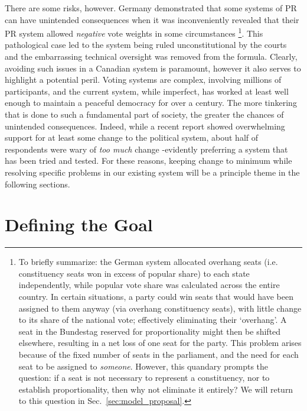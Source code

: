 \documentclass[DIV=calc, paper=a4, fontsize=11pt, twocolumn]{scrartcl}	 %
\begin{document}
There are some risks, however. Germany demonstrated that some systems of PR can have unintended consequences when it was inconveniently revealed that their PR system allowed \emph{negative} vote weights in some circumstances\cite{Die_Zeit_negative_vote} 
\footnote
{
To briefly summarize: the German system allocated overhang seats (i.e. constituency seats won in excess of popular share) to each state independently, while popular vote share was calculated across the entire country.
In certain situations, a party could win seats that would have been assigned to them anyway (via overhang constituency seats), with little change to its share of the national vote; effectively eliminating their `overhang'. A seat in the Bundestag reserved for proportionality might then be shifted elsewhere, resulting in a net loss of one seat for the party.
This problem arises because of the fixed number of seats in the parliament, and the need for each seat to be assigned to \emph{someone}. However, this quandary prompts the question: if a seat is not necessary to represent a constituency, nor to establish proportionality, then why not eliminate it entirely? We will return to this question in Sec.~\ref{sec:model_proposal}.
}.
This pathological case led to the system being ruled unconstitutional by the courts and the embarrassing technical oversight was removed from the formula. 
Clearly, avoiding such issues in a Canadian system is paramount, however it also serves to highlight a potential peril.
Voting systems are complex, involving millions of participants, and the current system, while imperfect, has worked at least well enough to maintain a peaceful democracy for over a century. The more tinkering that is done to such a fundamental part of society, the greater the chances of unintended consequences. 
Indeed, while a recent report\cite{Broadbent_poll} showed overwhelming support for at least some change to the political system, about half of respondents were wary of \emph{too much} change \--evidently preferring a system that has been tried and tested. For these reasons, keeping change to minimum while resolving specific problems in our existing system will be a principle theme in the following sections.


\section{Defining the Goal}
\label{sec:goal_list}
\end{document}

